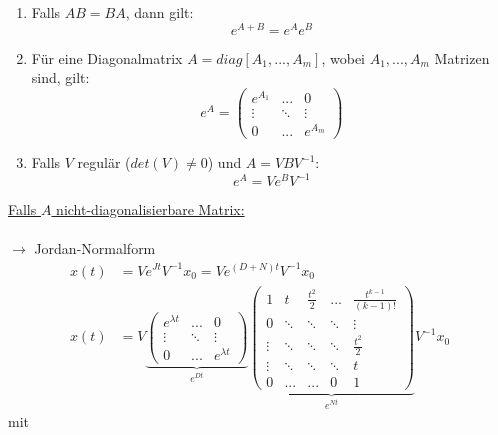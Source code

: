 \documentclass[a4paper,twocolumn,10pt]{article}
\begin{document}
\begin{enumerate}[label=$\bullet$]
\item Falls $AB=BA$, dann gilt:
\begin{equation*}
e^{A+B}=e^Ae^B
\end{equation*}
\item Für eine Diagonalmatrix $A=diag[A_1,...,A_m]$, wobei $A_1,...,A_m$ Matrizen sind, gilt:
\begin{equation*}
e^A=\begin{pmatrix}e^{A_1} & ... & 0 \\ \vdots & \ddots & \vdots \\ 0 & ... & e^{A_m}\end{pmatrix}
\end{equation*}
\item Falls $V$ regulär ($det(V)\neq 0$) und $A=VBV^{-1}$:
\begin{equation*}
e^A=Ve^BV^{-1}
\end{equation*}
\end{enumerate}
\underline{Falls $A$ nicht-diagonalisierbare Matrix:}\\\\
$\rightarrow$ Jordan-Normalform
\begin{equation*}
\begin{split}
x(t)&=Ve^{Jt}V^{-1}x_0=Ve^{(D+N)t}V^{-1}x_0\\
x(t)&=V\underbrace{\begin{pmatrix}e^{\lambda t} & ... & 0 \\ \vdots & \ddots & \vdots \\ 0 & ... & e^{\lambda t}\end{pmatrix}}_{e^{Dt}}\underbrace{\begin{pmatrix}1 & t & \frac{t^2}{2} & ... & \frac{t^{k-1}}{(k-1)!} \\ 0 & \ddots & \ddots & \ddots & \vdots \\ \vdots & \ddots & \ddots & \ddots & \frac{t^2}{2} \\ \vdots & \ddots & \ddots & \ddots & t \\ 0 & ... & ... & 0 & 1\end{pmatrix}}_{e^{Nt}}V^{-1}x_0
\end{split}
\end{equation*}
mit
\end{document}
